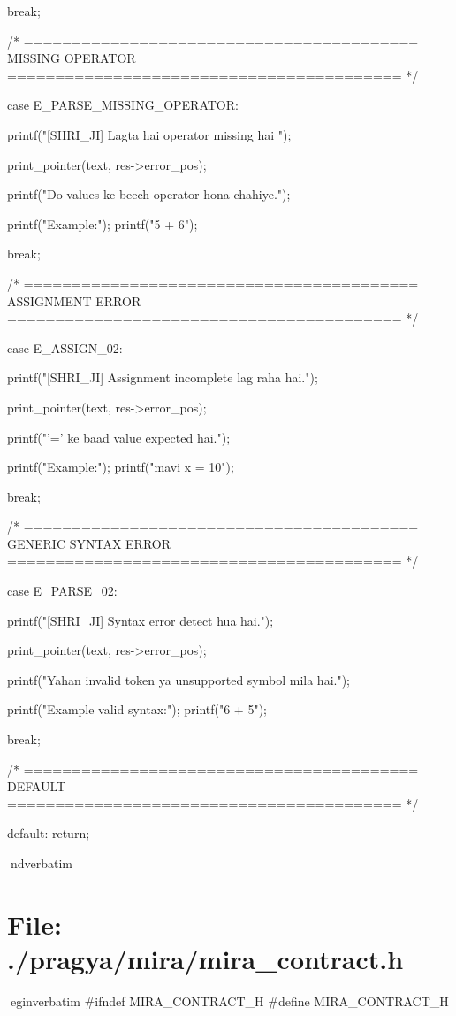 \documentclass{article}
\begin{document}
{{        break;


    /* =========================================
       MISSING OPERATOR
    ========================================= */

    case E_PARSE_MISSING_OPERATOR:

        printf("[SHRI_JI] Lagta hai operator missing hai \n\n");

        print_pointer(text, res->error_pos);

        printf("Do values ke beech operator hona chahiye.\n\n");

        printf("Example:\n");
        printf("5 + 6\n");

        break;


    /* =========================================
       ASSIGNMENT ERROR
    ========================================= */

    case E_ASSIGN_02:

        printf("[SHRI_JI] Assignment incomplete lag raha hai.\n\n");

        print_pointer(text, res->error_pos);

        printf("'=' ke baad value expected hai.\n\n");

        printf("Example:\n");
        printf("mavi x = 10\n");

        break;


    /* =========================================
       GENERIC SYNTAX ERROR
    ========================================= */

    case E_PARSE_02:

        printf("[SHRI_JI] Syntax error detect hua hai.\n\n");

        print_pointer(text, res->error_pos);

        printf("Yahan invalid token ya unsupported symbol mila hai.\n\n");

        printf("Example valid syntax:\n");
        printf("6 + 5\n");

        break;


    /* =========================================
       DEFAULT
    ========================================= */

default:
    return;
    }
}
nd{verbatim}
\section*{File: ./pragya/mira/mira_contract.h}
egin{verbatim}
#ifndef MIRA_CONTRACT_H
#define MIRA_CONTRACT_H
\end{document}
